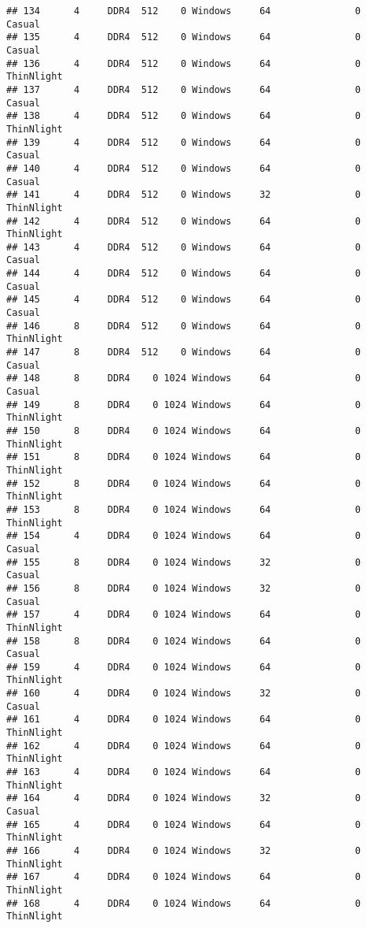 \documentclass[
]{article}
\begin{document}
\begin{verbatim}
## 134      4     DDR4  512    0 Windows     64               0     Casual
## 135      4     DDR4  512    0 Windows     64               0     Casual
## 136      4     DDR4  512    0 Windows     64               0 ThinNlight
## 137      4     DDR4  512    0 Windows     64               0     Casual
## 138      4     DDR4  512    0 Windows     64               0 ThinNlight
## 139      4     DDR4  512    0 Windows     64               0     Casual
## 140      4     DDR4  512    0 Windows     64               0     Casual
## 141      4     DDR4  512    0 Windows     32               0 ThinNlight
## 142      4     DDR4  512    0 Windows     64               0 ThinNlight
## 143      4     DDR4  512    0 Windows     64               0     Casual
## 144      4     DDR4  512    0 Windows     64               0     Casual
## 145      4     DDR4  512    0 Windows     64               0     Casual
## 146      8     DDR4  512    0 Windows     64               0 ThinNlight
## 147      8     DDR4  512    0 Windows     64               0     Casual
## 148      8     DDR4    0 1024 Windows     64               0     Casual
## 149      8     DDR4    0 1024 Windows     64               0 ThinNlight
## 150      8     DDR4    0 1024 Windows     64               0 ThinNlight
## 151      8     DDR4    0 1024 Windows     64               0 ThinNlight
## 152      8     DDR4    0 1024 Windows     64               0 ThinNlight
## 153      8     DDR4    0 1024 Windows     64               0 ThinNlight
## 154      4     DDR4    0 1024 Windows     64               0     Casual
## 155      8     DDR4    0 1024 Windows     32               0     Casual
## 156      8     DDR4    0 1024 Windows     32               0     Casual
## 157      4     DDR4    0 1024 Windows     64               0 ThinNlight
## 158      8     DDR4    0 1024 Windows     64               0     Casual
## 159      4     DDR4    0 1024 Windows     64               0 ThinNlight
## 160      4     DDR4    0 1024 Windows     32               0     Casual
## 161      4     DDR4    0 1024 Windows     64               0 ThinNlight
## 162      4     DDR4    0 1024 Windows     64               0 ThinNlight
## 163      4     DDR4    0 1024 Windows     64               0 ThinNlight
## 164      4     DDR4    0 1024 Windows     32               0     Casual
## 165      4     DDR4    0 1024 Windows     64               0 ThinNlight
## 166      4     DDR4    0 1024 Windows     32               0 ThinNlight
## 167      4     DDR4    0 1024 Windows     64               0 ThinNlight
## 168      4     DDR4    0 1024 Windows     64               0 ThinNlight

\end{verbatim}
\end{document}

